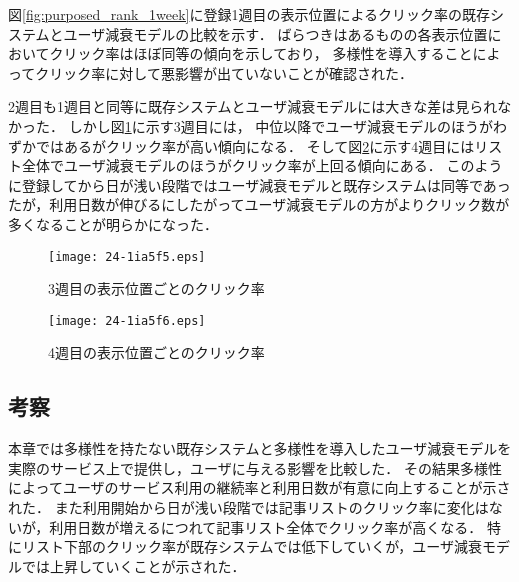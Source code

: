 \documentclass[japanese]{jnlp_1.4}
\begin{document}
図\ref{fig:purposed_rank_1week}に登録1週目の表示位置によるクリック率の既存システムとユーザ減衰モデルの比較を示す．
ばらつきはあるものの各表示位置においてクリック率はほぼ同等の傾向を示しており，
多様性を導入することによってクリック率に対して悪影響が出ていないことが確認された．

2週目も1週目と同等に既存システムとユーザ減衰モデルには大きな差は見られなかった．
しかし図\ref{fig:purposed_rank_3week}に示す3週目には，
中位以降でユーザ減衰モデルのほうがわずかではあるがクリック率が高い傾向になる．
そして図\ref{fig:purposed_rank_4week}に示す4週目にはリスト全体でユーザ減衰モデルのほうがクリック率が上回る傾向にある．
このように登録してから日が浅い段階ではユーザ減衰モデルと既存システムは同等であったが，利用日数が伸びるにしたがってユーザ減衰モデルの方がよりクリック数が多くなることが明らかになった．

\begin{figure}[t]
\begin{center}
\texttt{[image: 24-1ia5f5.eps]}
\end{center}
\caption{3週目の表示位置ごとのクリック率}
\label{fig:purposed_rank_3week}
\end{figure}

\begin{figure}[t]
\begin{center}
\texttt{[image: 24-1ia5f6.eps]}
\end{center}
\caption{4週目の表示位置ごとのクリック率}
\label{fig:purposed_rank_4week}
\end{figure}


\subsection{考察}

本章では多様性を持たない既存システムと多様性を導入したユーザ減衰モデルを実際のサービス上で提供し，ユーザに与える影響を比較した．
その結果多様性によってユーザのサービス利用の継続率と利用日数が有意に向上することが示された．
また利用開始から日が浅い段階では記事リストのクリック率に変化はないが，利用日数が増えるにつれて記事リスト全体でクリック率が高くなる．
特にリスト下部のクリック率が既存システムでは低下していくが，ユーザ減衰モデルでは上昇していくことが示された．
\end{document}
